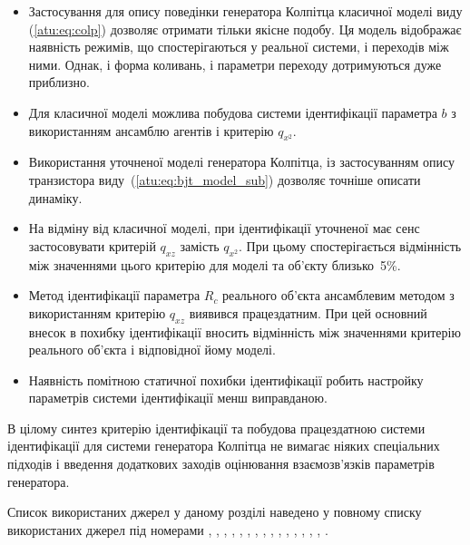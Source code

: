 \begin{itemize}

  \item
    Застосування для опису поведінки генератора Колпітца
    класичної моделі виду (\ref{atu:eq:colp}) дозволяє отримати тільки
    якісне подобу. Ця модель відображає наявність режимів, що
    спостерігаються у реальної системи, і переходів між ними. Однак,
    і форма коливань, і параметри переходу дотримуються дуже
    приблизно.

  \item
    Для класичної моделі можлива побудова системи ідентифікації
    параметра
    $b$ з використанням ансамблю агентів і критерію
    $ q_{x^2} $.

  \item
    Використання уточненої моделі генератора Колпітца, із
    застосуванням опису транзистора виду~(\ref{atu:eq:bjt_model_sub}) дозволяє
    точніше описати динаміку.

  \item
    На відміну від класичної моделі, при ідентифікації уточненої
    має сенс застосовувати критерій
    $ q_{xz} $ замість
    $ q_{x^2} $. При цьому спостерігається відмінність між значеннями
    цього критерію для моделі та об'єкту близько~5\%.

  \item
    Метод ідентифікації параметра
    $ R_c $ реального об'єкта ансамблевим методом з використанням
    критерію
    $ q_{xz} $ виявився працездатним. При цей основний внесок в похибку
    ідентифікації вносить відмінність між значеннями критерію
    реального об'єкта і відповідної йому моделі.

  \item
    Наявність помітною статичної похибки ідентифікації робить
    настройку параметрів системи ідентифікації менш виправданою.

\end{itemize}


В цілому синтез критерію ідентифікації та побудова працездатною
системи ідентифікації для системи генератора Колпітца
не вимагає ніяких спеціальних підходів і введення
додаткових заходів оцінювання взаємозв'язків параметрів
генератора.

Список використаних джерел у даному розділі наведено у повному
списку використаних джерел під номерами
\cite{atu_apir2013},
\cite{atu_st104a},
\cite{DBLP:journals/corr/WangWQ15},
\cite{dmitriev_gen_chaos},
\cite{doi:10.1063/1.4705999},
\cite{gummel_poon_1970},
\cite{shiskin_electronnie_pribori},
\cite{horowitz},
\cite{kennedy_chaos_colpitts},
\cite{atu_asau21},
\cite{Kennedy_Colpitts_predicting},
\cite{Kennedy_Colpitts_Chua},
\cite{PhysRevE.80.016201},
\cite{picovskii_syncro},
\cite{bonetti_super_persistent_colpitts},
\cite{zaeplnii_radio_calc}.


